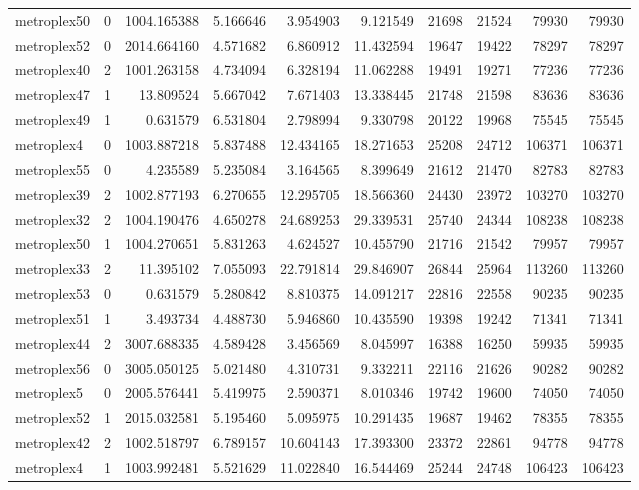 \begin{longtable}{|l|r|r|r|r|r|r|r|r|r|}
metroplex50 & 0 & 1004.165388 & 5.166646 & 3.954903 & 9.121549 & 21698 & 21524 & 79930 & 79930 \\
metroplex52 & 0 & 2014.664160 & 4.571682 & 6.860912 & 11.432594 & 19647 & 19422 & 78297 & 78297 \\
metroplex40 & 2 & 1001.263158 & 4.734094 & 6.328194 & 11.062288 & 19491 & 19271 & 77236 & 77236 \\
metroplex47 & 1 & 13.809524 & 5.667042 & 7.671403 & 13.338445 & 21748 & 21598 & 83636 & 83636 \\
metroplex49 & 1 & 0.631579 & 6.531804 & 2.798994 & 9.330798 & 20122 & 19968 & 75545 & 75545 \\
metroplex4 & 0 & 1003.887218 & 5.837488 & 12.434165 & 18.271653 & 25208 & 24712 & 106371 & 106371 \\
metroplex55 & 0 & 4.235589 & 5.235084 & 3.164565 & 8.399649 & 21612 & 21470 & 82783 & 82783 \\
metroplex39 & 2 & 1002.877193 & 6.270655 & 12.295705 & 18.566360 & 24430 & 23972 & 103270 & 103270 \\
metroplex32 & 2 & 1004.190476 & 4.650278 & 24.689253 & 29.339531 & 25740 & 24344 & 108238 & 108238 \\
metroplex50 & 1 & 1004.270651 & 5.831263 & 4.624527 & 10.455790 & 21716 & 21542 & 79957 & 79957 \\
metroplex33 & 2 & 11.395102 & 7.055093 & 22.791814 & 29.846907 & 26844 & 25964 & 113260 & 113260 \\
metroplex53 & 0 & 0.631579 & 5.280842 & 8.810375 & 14.091217 & 22816 & 22558 & 90235 & 90235 \\
metroplex51 & 1 & 3.493734 & 4.488730 & 5.946860 & 10.435590 & 19398 & 19242 & 71341 & 71341 \\
metroplex44 & 2 & 3007.688335 & 4.589428 & 3.456569 & 8.045997 & 16388 & 16250 & 59935 & 59935 \\
metroplex56 & 0 & 3005.050125 & 5.021480 & 4.310731 & 9.332211 & 22116 & 21626 & 90282 & 90282 \\
metroplex5 & 0 & 2005.576441 & 5.419975 & 2.590371 & 8.010346 & 19742 & 19600 & 74050 & 74050 \\
metroplex52 & 1 & 2015.032581 & 5.195460 & 5.095975 & 10.291435 & 19687 & 19462 & 78355 & 78355 \\
metroplex42 & 2 & 1002.518797 & 6.789157 & 10.604143 & 17.393300 & 23372 & 22861 & 94778 & 94778 \\
metroplex4 & 1 & 1003.992481 & 5.521629 & 11.022840 & 16.544469 & 25244 & 24748 & 106423 & 106423 \\

\end{longtable}
